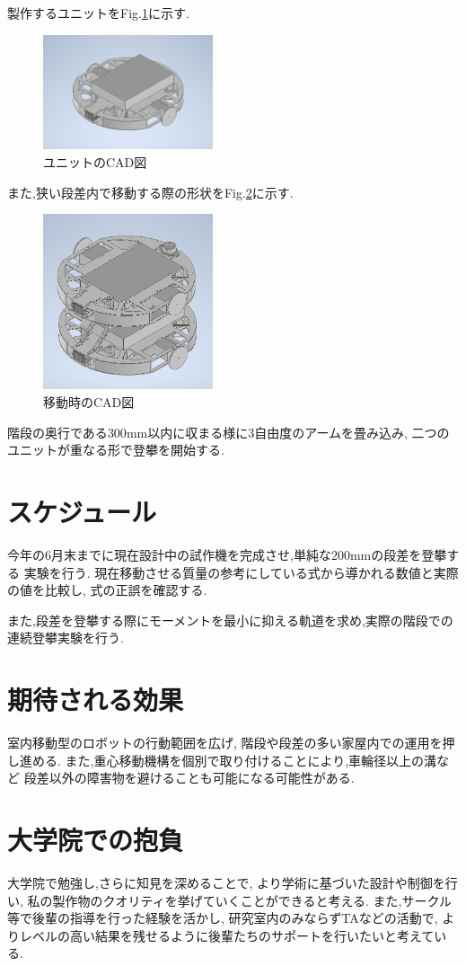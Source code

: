 \documentclass[dvipdfmx]{jsarticle}
\begin{document}
製作するユニットをFig.\ref*{fig:CAD}に示す.
\begin{figure}[H]
\centering
\includegraphics[width=50mm]{image/1unit.png}
\caption{ユニットのCAD図}
\label{fig:CAD}
\end{figure}
また,狭い段差内で移動する際の形状をFig.\ref*{fig:move}に示す.

\begin{figure}[H]
\centering
\includegraphics[width=50mm]{image/kasane.png}
\caption{移動時のCAD図}
\label{fig:move}
\end{figure}

階段の奥行である$300\mathrm{mm}$以内に収まる様に3自由度のアームを畳み込み,
二つのユニットが重なる形で登攀を開始する.
\section{スケジュール}
今年の6月末までに現在設計中の試作機を完成させ,単純な$200\mathrm{mm}$の段差を登攀する
実験を行う.
現在移動させる質量の参考にしている式から導かれる数値と実際の値を比較し,
式の正誤を確認する.

また,段差を登攀する際にモーメントを最小に抑える軌道を求め,実際の階段での連続登攀実験を行う.

\section{期待される効果}
室内移動型のロボットの行動範囲を広げ,
階段や段差の多い家屋内での運用を押し進める.
また,重心移動機構を個別で取り付けることにより,車輪径以上の溝など
段差以外の障害物を避けることも可能になる可能性がある.
\section{大学院での抱負}
大学院で勉強し,さらに知見を深めることで,
より学術に基づいた設計や制御を行い,
私の製作物のクオリティを挙げていくことができると考える.
また,サークル等で後輩の指導を行った経験を活かし,
研究室内のみならずTAなどの活動で,
よりレベルの高い結果を残せるように後輩たちのサポートを行いたいと考えている.
\end{document}
